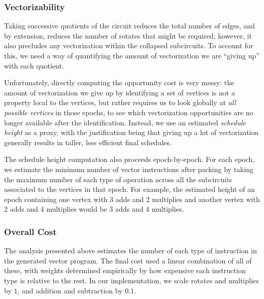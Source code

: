 \subsubsection*{Vectorizability}
Taking successive quotients of the circuit reduces the total number of edges, and by extension, reduces the number of rotates that might be required; however, it also precludes any vectorization within the collapsed subcircuits.
To account for this, we need a way of quantifying the amount of vectorization we are ``giving up'' with each quotient.

Unfortunately, directly computing the opportunity cost is very messy: the amount of vectorization we give up by identifying a set of vertices is not a property local to the vertices, but rather requires us to look globally at {\em all possible vertices} in those epochs, to see which vectorization opportunities are no longer available after the identification.
Instead, we use an estimated {\em schedule height} as a proxy, with the justification being that giving up a lot of vectorization generally results in taller, less efficient final schedules. 

The schedule height computation also proceeds epoch-by-epoch.
For each epoch, we estimate the minimum number of vector instructions after packing by taking the maximum number of each type of operation across all the subcircuits associated to the vertices in that epoch.
For example, the estimated height of an epoch containing one vertex with 3 adds and 2 multiplies and another vertex with 2 adds and 4 multiplies would be 3 adds and 4 multiplies.

\subsubsection*{Overall Cost}
The analysis presented above estimates the number of each type of instruction in the generated vector program.
The final cost used a linear combination of all of these, with weights determined empirically by how expensive each instruction type is relative to the rest.
In our implementation, we scale rotates and multiplies by $1$, and addition and subtraction by $0.1$. 

